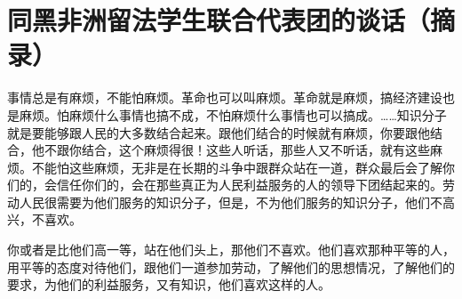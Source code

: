 \section[同黑非洲留法学生联合代表团的谈话（摘录）（一九六五年九月十四日）]{同黑非洲留法学生联合代表团的谈话（摘录）}


事情总是有麻烦，不能怕麻烦。革命也可以叫麻烦。革命就是麻烦，搞经济建设也是麻烦。怕麻烦什么事情也搞不成，不怕麻烦什么事情也可以搞成。……知识分子就是要能够跟人民的大多数结合起来。跟他们结合的时候就有麻烦，你要跟他结合，他不跟你结合，这个麻烦得很！这些人听话，那些人又不听话，就有这些麻烦。不能怕这些麻烦，无非是在长期的斗争中跟群众站在一道，群众最后会了解你们的，会信任你们的，会在那些真正为人民利益服务的人的领导下团结起来的。劳动人民很需要为他们服务的知识分子，但是，不为他们服务的知识分子，他们不高兴，不喜欢。

你或者是比他们高一等，站在他们头上，那他们不喜欢。他们喜欢那种平等的人，用平等的态度对待他们，跟他们一道参加劳动，了解他们的思想情况，了解他们的要求，为他们的利益服务，又有知识，他们喜欢这样的人。

